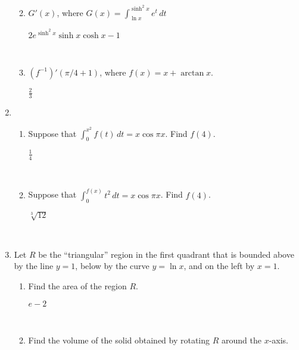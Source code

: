 \documentclass[]{handout}
\begin{document}
\begin{enumerate}[(1)]
\begin{enumerate}
		\

		\item $G'(x)$, where $\displaystyle G(x) = \int_{\ln x}^{\sinh^2 x} e^t \, dt$

\begin{answer} 
		$\displaystyle 2 e^{\sinh^2x}\sinh x \cosh x - 1$
\end{answer}

		\

		\item $(f^{-1})'(\pi/4 + 1)$, where $f(x) = x + \arctan x$.

\begin{answer} 
		$\displaystyle \frac 2 3$
\end{answer}

	\end{enumerate}

	\item	\begin{enumerate} %
		\item Suppose that $\displaystyle \int_0^{x^2} f(t) \, dt = x \cos \pi x$.  Find $f(4)$.

\begin{answer} 
		$\displaystyle \frac 1 4$
\end{answer}

		\

		\item Suppose that $\displaystyle \int_0^{f(x)} t^2 \, dt = x \cos \pi x$.  Find $f(4)$.

\begin{answer} 
		$\displaystyle \sqrt[3]{12}$
\end{answer}

		\
	\end{enumerate}


	\item Let $R$ be the ``triangular'' region in the first quadrant that is bounded above by
		the line $y = 1$, below by the curve $y = \ln x$, and on the left by $x = 1$.
	\begin{enumerate}

		\item Find the area of the region $R$.

\begin{answer} 
		$e - 2$
\end{answer}

		\

		\item Find the volume of the solid obtained by rotating $R$ around the $x$-axis.


\end{enumerate}
\end{enumerate}
\end{document}
